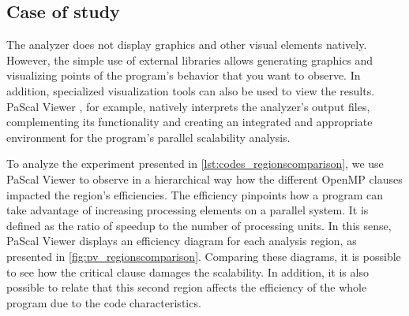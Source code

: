 \begin{table}[H]
	\caption{Dataframe generated automatically from collected samples using the Python API.}
	\label{tab:regtable_dedup}
	
\end{table}

\subsection{Case of study}\label{subsec:pfv_case_of_study}

The analyzer does not display graphics and other visual elements natively. However, the simple use of external libraries allows generating graphics and visualizing points of the program's behavior that you want to observe. In addition, specialized visualization tools can also be used to view the results. PaScal Viewer \cite{Silva2018}, for example, natively interprets the analyzer's output files, complementing its functionality and creating an integrated and appropriate environment for the program's parallel scalability analysis.

To analyze the experiment presented in \cref{lst:codes_regionscomparison}, we use PaScal Viewer to observe in a hierarchical way how the different OpenMP clauses impacted the region's efficiencies. The efficiency pinpoints how a program can take advantage of increasing processing elements on a parallel system. It is defined as the ratio of speedup to the number of processing units. In this sense, PaScal Viewer displays an efficiency diagram for each analysis region, as presented in \cref{fig:pv_regionscomparison}. Comparing these diagrams, it is possible to see how the critical clause damages the scalability. In addition, it is also possible to relate that this second region affects the efficiency of the whole program due to the code characteristics.

